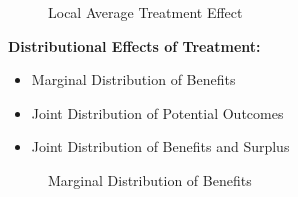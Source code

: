  
\begin{frame}
\begin{figure}[htp]\centering
	\caption{Local Average Treatment Effect}\label{Local Average Treatment}
\end{figure}
\end{frame} 
 
 
\begin{frame}  
\textbf{Distributional Effects of Treatment:}
\begin{itemize}
\item Marginal Distribution of Benefits
\item Joint Distribution of Potential Outcomes
\item Joint Distribution of Benefits and Surplus
\end{itemize}
\end{frame}


\begin{frame}
\begin{figure}[htp]\centering
	\caption{Marginal Distribution of Benefits}\label{Treatment Effects Benefits}
\end{figure}
\end{frame}


